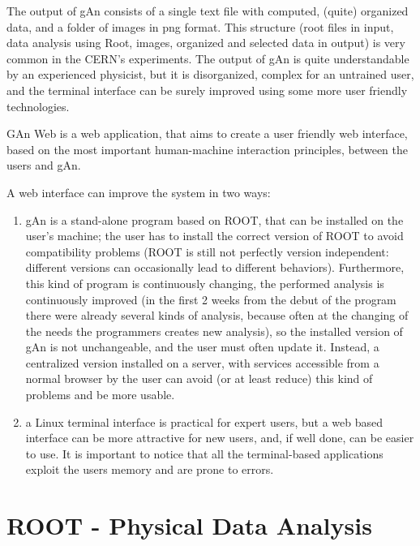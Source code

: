 The output of gAn consists of a single text file with computed, (quite) organized data, and a folder of images in png format.
This structure (root files in input, data analysis using Root, images, organized and selected data in output) is very common in the CERN's experiments. 
The output of gAn is quite understandable by an experienced physicist, but it is disorganized, complex for an untrained user, and the terminal interface can be surely improved using some more user friendly technologies.

GAn Web is a web application, that aims to create a user friendly web interface, based on the most important human-machine interaction principles, between the users and gAn. 

A web interface can improve the system in two ways:

\begin{enumerate}

\item gAn is a stand-alone program based on ROOT, that can be installed on the user's machine; the user has to install the correct version of ROOT to avoid compatibility problems (ROOT is still not perfectly version independent: different versions can occasionally lead to different behaviors). Furthermore, this kind of program is continuously changing, the performed analysis is continuously improved (in the first 2 weeks from the debut of the program there were already several kinds of analysis, because often at the changing of the needs the programmers creates new analysis), so the installed version of gAn is not unchangeable, and the user must often update it. Instead, a centralized version installed on a server, with services accessible from a normal browser by the user can avoid (or at least reduce) this kind of problems and be more usable.    
 

\item a Linux terminal interface is practical for expert users, but a web based interface can be more attractive for new users, and, if well done, can be easier to use. It is important to notice that all the terminal-based applications exploit the users memory and are prone to errors.


\end{enumerate}



\section{ROOT - Physical Data Analysis }

